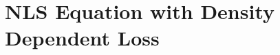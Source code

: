 %
%

\clearpage
\section[Nonlinear Schr\"{o}dinger Equation with Density Dependent Loss]{NLS Equation with Density Dependent Loss}
\label{section:DDL}


